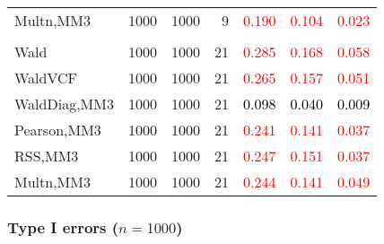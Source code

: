 \documentclass[
]{article}
\begin{document}
\begin{table}[H]
{\begin{tabular}[t]{lrrrrrr}
\hspace{1em}Multn,MM3 & 1000 & 1000 & 9 & \textcolor{red}{0.190} & \textcolor{red}{0.104} & \textcolor{red}{0.023}\\
\addlinespace[0.3em]
\multicolumn{7}{l}{\textbf{3F 15V}}\\
\hspace{1em}Wald & 1000 & 1000 & 21 & \textcolor{red}{0.285} & \textcolor{red}{0.168} & \textcolor{red}{0.058}\\
\hspace{1em}WaldVCF & 1000 & 1000 & 21 & \textcolor{red}{0.265} & \textcolor{red}{0.157} & \textcolor{red}{0.051}\\
\hspace{1em}WaldDiag,MM3 & 1000 & 1000 & 21 & \textcolor{black}{0.098} & \textcolor{black}{0.040} & \textcolor{black}{0.009}\\
\hspace{1em}Pearson,MM3 & 1000 & 1000 & 21 & \textcolor{red}{0.241} & \textcolor{red}{0.141} & \textcolor{red}{0.037}\\
\hspace{1em}RSS,MM3 & 1000 & 1000 & 21 & \textcolor{red}{0.247} & \textcolor{red}{0.151} & \textcolor{red}{0.037}\\
\hspace{1em}Multn,MM3 & 1000 & 1000 & 21 & \textcolor{red}{0.244} & \textcolor{red}{0.141} & \textcolor{red}{0.049}\\
\bottomrule
\end{tabular}}
\endgroup{}
\end{table}

\subsubsection{\texorpdfstring{Type I errors
(\(n=1000\))}{Type I errors (n=1000)}}\label{type-i-errors-n1000-1}
\end{document}
